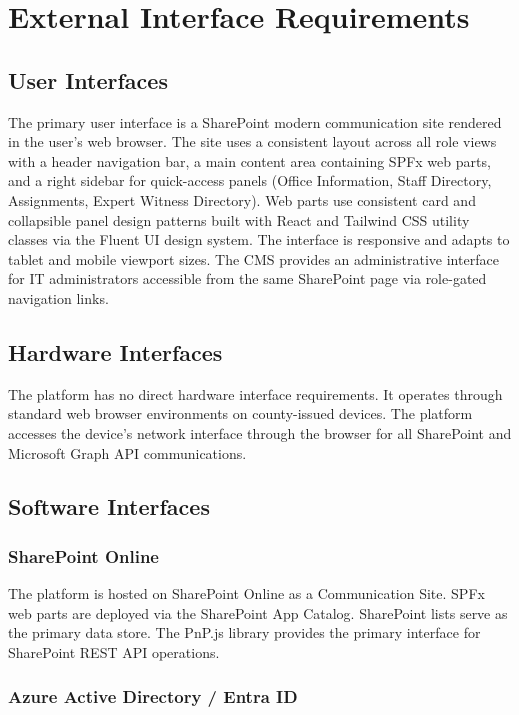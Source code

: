 \documentclass[12pt]{article}
\begin{document}
\section{External Interface Requirements}

\subsection{User Interfaces}

The primary user interface is a SharePoint modern communication site rendered in the user's web browser. The site uses a consistent layout across all role views with a header navigation bar, a main content area containing SPFx web parts, and a right sidebar for quick-access panels (Office Information, Staff Directory, Assignments, Expert Witness Directory). Web parts use consistent card and collapsible panel design patterns built with React and Tailwind CSS utility classes via the Fluent UI design system. The interface is responsive and adapts to tablet and mobile viewport sizes. The CMS provides an administrative interface for IT administrators accessible from the same SharePoint page via role-gated navigation links.

\subsection{Hardware Interfaces}

The platform has no direct hardware interface requirements. It operates through standard web browser environments on county-issued devices. The platform accesses the device's network interface through the browser for all SharePoint and Microsoft Graph API communications.

\subsection{Software Interfaces}

\subsubsection{SharePoint Online}

The platform is hosted on SharePoint Online as a Communication Site. SPFx web parts are deployed via the SharePoint App Catalog. SharePoint lists serve as the primary data store. The PnP.js library provides the primary interface for SharePoint REST API operations.

\subsubsection{Azure Active Directory / Entra ID}
\end{document}
